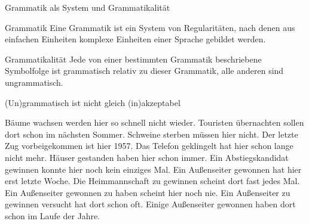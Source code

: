 \begin{frame}
  {Grammatik als System und Grammatikalität}
  \onslide<+->
  \onslide<+->
  \begin{block}{Grammatik}
    Eine Grammatik ist ein \alert{System von Regularitäten}, nach denen aus einfachen Einheiten
    komplexe Einheiten einer Sprache gebildet werden.
  \end{block}
  \Zeile

  \onslide<+->

  \begin{block}{Grammatikalität}
    Jede von einer bestimmten Grammatik beschriebene Symbolfolge ist \alert{grammatisch}
    relativ zu dieser Grammatik, alle anderen sind \alert{ungrammatisch}.
  \end{block}
\end{frame}

\begin{frame}
  {(Un)grammatisch ist nicht gleich (in)akzeptabel}
  \onslide<+->
  \onslide<+->
  \begin{exe}
    \ex\begin{xlist}
      \ex Bäume wachsen werden hier so schnell nicht wieder.
      \onslide<+->
      \ex Touristen übernachten sollen dort schon im nächsten Sommer.
      \onslide<+->
      \ex Schweine sterben müssen hier nicht.
      \onslide<+->
      \ex Der letzte Zug vorbeigekommen ist hier 1957.
      \onslide<+->
      \ex Das Telefon geklingelt hat hier schon lange nicht mehr.
      \onslide<+->
      \ex Häuser gestanden haben hier schon immer.
      \onslide<+->
      \ex Ein Abstiegskandidat gewinnen konnte hier noch kein einziges Mal.
      \onslide<+->
      \ex Ein Außenseiter gewonnen hat hier erst letzte Woche.
      \onslide<+->
      \ex Die Heimmannschaft zu gewinnen scheint dort fast jedes Mal.
      \onslide<+->
      \ex Ein Außenseiter gewonnen zu haben scheint hier noch nie.
      \onslide<+->
      \ex Ein Außenseiter zu gewinnen versucht hat dort schon oft.
      \onslide<+->
      \ex Einige Außenseiter gewonnen haben dort schon im Laufe der Jahre.
    \end{xlist}
  \end{exe}
\end{frame}

